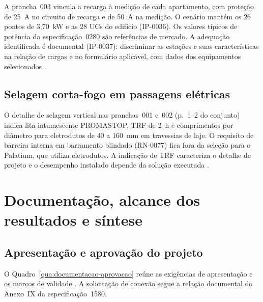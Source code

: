 A prancha~003 vincula a recarga à medição de cada apartamento, com proteção de 25~A no circuito de recarga e de 50~A na medição. O cenário mantém os 26 pontos de 3,70~kW e as 28 UCs do edifício (IP-0036). Os valores típicos de potência da especificação~0280 são referências de mercado. A adequação identificada é documental (IP-0037): discriminar as estações e suas características na relação de cargas e no formulário aplicável, com dados dos equipamentos selecionados \cite[prancha~003]{palatiumpranchas2025}\cite[Tabelas~2 e~4 e item~7.1.12]{enel0280}\cite[Tabela~4]{enel1580}.

\subsection{Selagem corta-fogo em passagens elétricas}

O detalhe de selagem vertical nas pranchas~001 e~002 (p.~1--2 do conjunto) indica fita intumescente PROMASTOP, TRF de 2~h e comprimentos por diâmetro para eletrodutos de 40 a 160~mm em travessias de laje. O requisito de barreira interna em barramento blindado (RN-0077) fica fora da seleção para o Palatium, que utiliza eletrodutos. A indicação de TRF caracteriza o detalhe de projeto e o desempenho instalado depende da solução executada \cite[pranchas~001--002]{palatiumpranchas2025}\cite[item~6.2.9.6]{abnt5410}.

\section{Documentação, alcance dos resultados e síntese}

\subsection{Apresentação e aprovação do projeto}

O Quadro~\ref{qua:documentacao-aprovacao} reúne as exigências de apresentação e os marcos de validade \cite[seção~7.12]{enel0126}\cite[seções~7.2--7.4 e Tabelas~2--6]{enel1580}. A solicitação de conexão segue a relação documental do Anexo~IX da especificação~1580.


